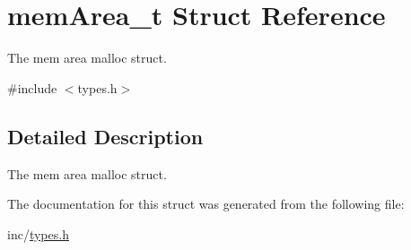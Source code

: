 \hypertarget{structmem_area__t}{
\section{memArea\_\-t Struct Reference}
\label{structmem_area__t}
}


The mem area malloc struct.  




{\ttfamily \#include $<$types.h$>$}



\subsection{Detailed Description}
The mem area malloc struct. 

The documentation for this struct was generated from the following file:\begin{DoxyCompactItemize}
\item 
inc/\hyperlink{types_8h}{types.h}\end{DoxyCompactItemize}
